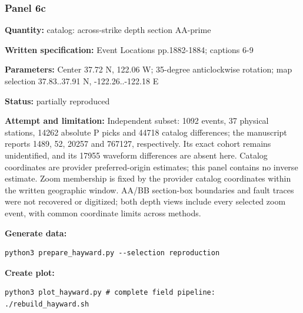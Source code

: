 \subsubsection*{Panel 6c}
\noindent\textbf{Quantity:} catalog: across-strike depth section AA-prime\par
\noindent\textbf{Written specification:} Event Locations pp.1882-1884; captions 6-9\par
\noindent\textbf{Parameters:} Center 37.72 N, 122.06 W; 35-degree anticlockwise rotation; map selection 37.83..37.91 N, -122.26..-122.18 E\par
\noindent\textbf{Status:} partially reproduced\par
\noindent\textbf{Attempt and limitation:} Independent subset: 1092 events, 37 physical stations, 14262 absolute P picks and 44718 catalog differences; the manuscript reports 1489, 52, 20257 and 767127, respectively. Its exact cohort remains unidentified, and its 17955 waveform differences are absent here. Catalog coordinates are provider preferred-origin estimates; this panel contains no inverse estimate. Zoom membership is fixed by the provider catalog coordinates within the written geographic window. AA/BB section-box boundaries and fault traces were not recovered or digitized; both depth views include every selected zoom event, with common coordinate limits across methods.\par
\noindent\textbf{Generate data:}
\begin{lstlisting}
python3 prepare_hayward.py --selection reproduction
\end{lstlisting}
\noindent\textbf{Create plot:}
\begin{lstlisting}
python3 plot_hayward.py # complete field pipeline: ./rebuild_hayward.sh
\end{lstlisting}
